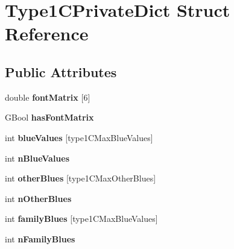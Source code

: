 \hypertarget{struct_type1_c_private_dict}{}\section{Type1\+C\+Private\+Dict Struct Reference}
\label{struct_type1_c_private_dict}
\subsection*{Public Attributes}
\begin{DoxyCompactItemize}
\item 
\mbox{\label{struct_type1_c_private_dict_ac01d6405ebd42970e01196b0c88bceab}} 
double {\bfseries font\+Matrix} \mbox{[}6\mbox{]}
\item 
\mbox{\label{struct_type1_c_private_dict_a06430d0efa36f79cac4229da561aa13c}} 
G\+Bool {\bfseries has\+Font\+Matrix}
\item 
\mbox{\label{struct_type1_c_private_dict_a8c6ba51a1e5d0079b5a34d1bb19c3ee6}} 
int {\bfseries blue\+Values} \mbox{[}type1\+C\+Max\+Blue\+Values\mbox{]}
\item 
\mbox{\label{struct_type1_c_private_dict_a521ce06de12684c0203535c3305b96f6}} 
int {\bfseries n\+Blue\+Values}
\item 
\mbox{\label{struct_type1_c_private_dict_ab443a17cff88a5220fac633ac9010912}} 
int {\bfseries other\+Blues} \mbox{[}type1\+C\+Max\+Other\+Blues\mbox{]}
\item 
\mbox{\label{struct_type1_c_private_dict_a2dab9139f849ef6aa8e47af452a3bb0a}} 
int {\bfseries n\+Other\+Blues}
\item 
\mbox{\label{struct_type1_c_private_dict_ad87612711f4e3e0b9e72120dbc7b6e68}} 
int {\bfseries family\+Blues} \mbox{[}type1\+C\+Max\+Blue\+Values\mbox{]}
\item 
\mbox{\label{struct_type1_c_private_dict_ace50b57a446434cf53fa37847755ad82}} 
int {\bfseries n\+Family\+Blues}

\end{DoxyCompactItemize}
